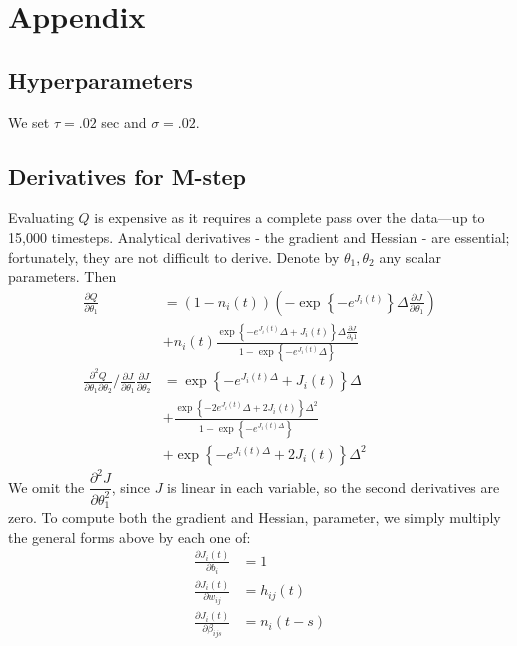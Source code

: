\documentclass{article}
\begin{document}
\begin{small}

 
\end{small}

\section*{Appendix}
\subsection{Hyperparameters}
We set $\tau=.02$ sec and $\sigma=.02$.
\subsection{Derivatives for M-step}
Evaluating $Q$ is expensive as it requires a complete pass over the
data---up to 15,000 timesteps. Analytical derivatives - the gradient and Hessian - are essential;
fortunately, they are not difficult to derive. Denote by
$\theta_1, \theta_2$ any scalar parameters. Then
\begin{align*}
\frac{\partial Q}{\partial \theta_1} &= \left(1 - n_i(t)\right) \left(-\exp{\left\{-e^{J_i(t)}\right\}} \Delta \frac{\partial J}{\partial \theta_1}\right) \\
    &+ n_i(t) \frac{\exp{ \left\{ -e^{J_i(t)} \Delta + J_i(t) \right\}} \Delta \frac{\partial J}{\partial_\theta1} }{1 - \exp{\left\{-e^{J_i(t)}\Delta\right\}}} \\
\frac{\partial^2 Q}{\partial \theta_1 \partial \theta_2} / \frac{\partial J}{\partial \theta_1} \frac{\partial J}{\partial \theta_2} &= \exp{\left\{-e^{J_i(t)\Delta} + J_i(t)\right\}}\Delta \\
 &+ \frac{\exp{\left\{-2e^{J_i(t)}\Delta + 2J_i(t)\right\}}\Delta^2}{1 - \exp{\left\{-e^{J_i(t)\Delta}\right\}}} \\
 &+ \exp{\left\{-e^{J_i(t)\Delta} + 2J_i(t)\right\}} \Delta^2 
\end{align*}
We omit the $\dfrac{\partial^2 J}{\partial \theta_1^2}$, since $J$
is linear in each variable, so the second derivatives are zero. To
compute both the gradient and Hessian, parameter, we simply multiply
the general forms above by each one of:
\begin{align}
\frac{\partial J_i(t)}{\partial b_i}         &= 1 \\
\frac{\partial J_i(t)}{\partial w_{ij}}      &= h_{ij}(t) \\
\frac{\partial J_i(t)}{\partial \beta_{ijs}} &= n_i(t - s)
\end{align}
\end{document}
